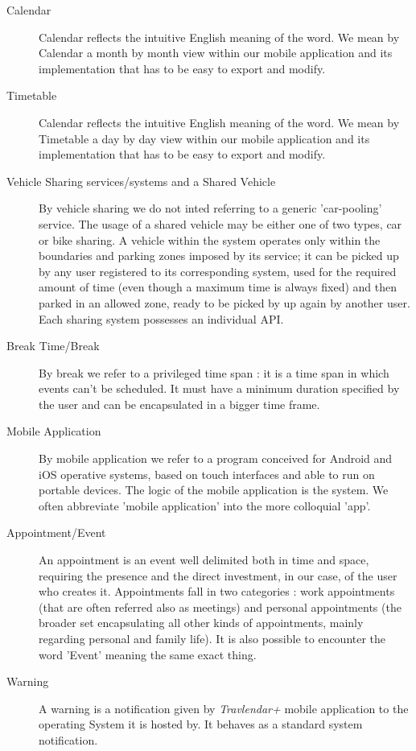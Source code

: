 \begin{description}
		\item[Calendar] Calendar reflects the intuitive English meaning of the word. We mean by Calendar a month by month view within our mobile application and its implementation that has to be easy to export and modify.
				
		\item[Timetable] Calendar reflects the intuitive English meaning of the word. We mean by Timetable a day by day view within our mobile application and its implementation that has to be easy to export and modify.
			      
		\item[Vehicle Sharing services/systems and a Shared Vehicle] By vehicle sharing we do not inted referring to a generic 'car-pooling' service. The usage of a shared vehicle may be either one of two types, car or bike sharing. A vehicle within the system operates only within the boundaries and parking zones imposed by its service; it can be picked up by any user registered to its corresponding system, used for the required amount of time (even though a maximum time is always fixed) and then parked in an allowed zone, ready to be picked by up again by another user. Each sharing system possesses an individual API.
				
		\item[Break Time/Break] By break we refer to a privileged time span : it is a time span in which events can't be scheduled. It must have a minimum duration specified by the user and can be encapsulated in a bigger time frame.
				
		\item[Mobile Application] By mobile application we refer to a program conceived for Android and iOS operative systems, based on touch interfaces and able to run on portable devices. The logic of the mobile application is the system. We often abbreviate 'mobile application' into the more colloquial 'app'.
				
		\item[Appointment/Event] An appointment is an event well delimited both in time and space, requiring the presence and the direct investment, in our case, of the user who creates it. Appointments fall in two categories : work appointments (that are often referred also as meetings) and personal appointments (the broader set encapsulating all other kinds of appointments, mainly regarding personal and family life). It is also possible to encounter the word 'Event' meaning the same exact thing.
				
		\item[Warning] A warning is a notification given by \textit{Travlendar+} mobile application to the operating System it is hosted by. It behaves as a standard system notification.
				

\end{description}
